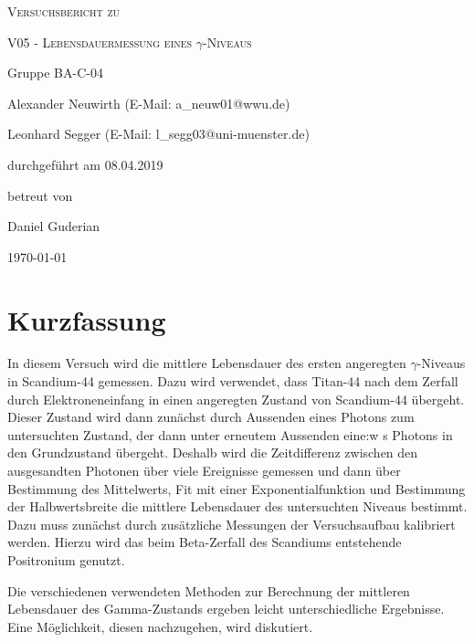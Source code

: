 \documentclass[
	a4paper,
	12pt,
	pagesize,
	ngerman
]{scrartcl}
\begin{document}
	\begin{titlepage}
		\centering
		{\scshape\LARGE Versuchsbericht zu \par}
		\vspace{1cm}
		{\scshape\huge V05 - Lebensdauermessung eines $\gamma$-Niveaus \par}
		\vspace{2.5cm}
		{\LARGE Gruppe BA-C-04 \par}
		\vspace{0.5cm}

		{\large Alexander Neuwirth (E-Mail: a\_neuw01@wwu.de) \par}
		{\large Leonhard Segger (E-Mail: l\_segg03@uni-muenster.de) \par}
		\vfill

		durchgeführt am 08.04.2019\par
		betreut von\par
		{\large Daniel Guderian}
		\vfill

		{\large \today\par}
	\end{titlepage}
	\tableofcontents
	\newpage


	\section{Kurzfassung}
	In diesem Versuch wird die mittlere Lebensdauer des ersten angeregten $\gamma$-Niveaus in Scandium-44 gemessen.
	Dazu wird verwendet, dass Titan-44 nach dem Zerfall durch Elektroneneinfang in einen angeregten Zustand von Scandium-44 übergeht.
	Dieser Zustand wird dann zunächst durch Aussenden eines Photons zum untersuchten Zustand, der dann unter erneutem Aussenden eine:w
	s Photons in den Grundzustand übergeht.
	Deshalb wird die Zeitdifferenz zwischen den ausgesandten Photonen über viele Ereignisse gemessen und dann über Bestimmung des Mittelwerts, Fit mit einer Exponentialfunktion und Bestimmung der Halbwertsbreite die mittlere Lebensdauer des untersuchten Niveaus bestimmt.
	Dazu muss zunächst durch zusätzliche Messungen der Versuchsaufbau kalibriert werden.
	Hierzu wird das beim Beta-Zerfall des Scandiums entstehende Positronium genutzt.

	Die verschiedenen verwendeten Methoden zur Berechnung der mittleren Lebensdauer des Gamma-Zustands ergeben leicht unterschiedliche Ergebnisse.
	Eine Möglichkeit, diesen nachzugehen, wird diskutiert.
\end{document}
